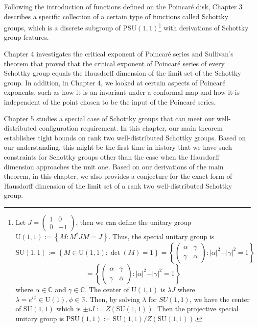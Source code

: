\documentclass[12pt,oneside]{sfsuthesis}
\theoremstyle{plain} %
\theoremstyle{definition}  %
\theoremstyle{remark}  %
\theoremstyle{plain}
\begin{document}
{Following the introduction of functions defined on the Poincar\'{e} disk, Chapter 3 describes a specific collection of a certain type of functions called Schottky groups, which is a discrete subgroup of $\text{PSU}(1,1)$\footnote{Let $J=\begin{pmatrix}
1 &  0\\
0 &  -1
\end{pmatrix}$, then we can define the unitary group $\text{U}(1,1):=\left\lbrace M: M^{\dagger}JM=J\right\rbrace$. Thus, the special unitary group is $$\text{SU}(1,1):=\left\lbrace M\in \text{U}(1,1): \det(M)
=1\right\rbrace
=\left\lbrace \begin{pmatrix}
\alpha &  \gamma\\
\overline{\gamma} &  \overline{\alpha}
\end{pmatrix}: \vert \alpha \vert^2-\vert \gamma\vert^2=1\right\rbrace
$$
$$
=\left\lbrace \begin{pmatrix}
\alpha &  \overline{\gamma}\\
\gamma &  \overline{\alpha}
\end{pmatrix}: \vert \alpha \vert^2-\vert \gamma\vert^2=1\right\rbrace$$ where $\alpha\in\mathbb{C}$ and $\gamma\in\mathbb{C}$. The center of $\text{U}(1,1)$ is $\lambda J$ where $\lambda = e^{i\phi}\in \text{U}(1), \phi\in\mathbb{R}$. Then, by solving $\lambda$ for $SU(1,1)$, we have the center of $\text{SU}(1,1)$ which is $\pm i J:=Z(\text{SU}(1,1))$. Then the projective special unitary group is $\text{PSU}(1,1):=\text{SU}(1,1)/Z(\text{SU}(1,1))$.} with derivations of Schottky group features.


Chapter 4 investigates the critical exponent of Poincar\'{e} series and Sullivan's theorem that proved that the critical exponent of Poincar\'{e} series of every Schottky group equals the Hausdorff dimension of the limit set of the Schottky group. In addition, in Chapter 4, we looked at certain aspects of Poincar\'{e} exponents, such as how it is an invariant under a conformal map and how it is independent of the point chosen to be the input of the Poincar\'{e} series. 


Chapter 5 studies a special case of Schottky groups that can meet our well-distributed configuration requirement. In this chapter, our main theorem establishes tight bounds on rank two well-distributed Schottky groups. Based on our understanding, this might be the first time in history that we have such constraints for Schottky groups other than the case when the Hausdorff dimension approaches the unit one. Based on our derivations of the main theorem, in this chapter, we also provides a conjecture for the exact form of Hausdorff dimension of the limit set of a rank two well-distributed Schottky group.


}
\end{document}
